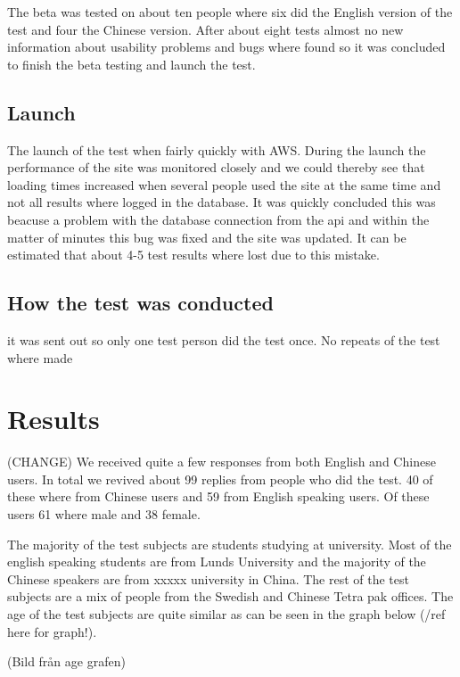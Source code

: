 The beta was tested on about ten people where six did the English version of the test and four the Chinese version. After about eight tests almost no new information about usability problems and bugs where found so it was concluded to finish the beta testing and launch the test.

\subsection{Launch}
The launch of the test when fairly quickly with AWS. During the launch the performance of the site was monitored closely and we could thereby see that loading times increased when several people used the site at the same time and not all results where logged in the database. It was quickly concluded this was beacuse a problem with the database connection from the api and within the matter of minutes this bug was fixed and the site was updated. It can be estimated that about 4-5 test results where lost due to this mistake.

\subsection{How the test was conducted}
it was sent out so only one test person did the test once. No repeats of the test where made

\section{Results} (CHANGE)
We received quite a few responses from both English and Chinese users. In total we revived about 99 replies from people who did the test. 40 of these where from Chinese users and 59 from English speaking users. Of these users 61 where male and 38 female.  
 
 The majority of the test subjects are students studying at university. Most of the english speaking students are from Lunds University and the majority of the Chinese speakers are from xxxxx university in China. The rest of the test subjects are a mix of people from the Swedish and Chinese Tetra pak offices.
 The age of the test subjects are quite similar as can be seen in the graph below (/ref here for graph!).
 
(Bild från age grafen)
 

